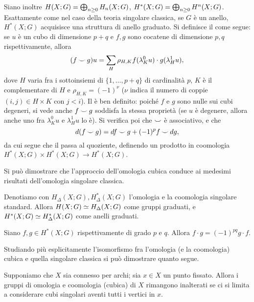 Siano inoltre $H(X;G)=\bigoplus_{n\ge 0}H_n(X;G)$, $H^*(X;G)=\bigoplus_{n\ge 0}H^n(X;G)$. Esattamente come nel caso della teoria singolare classica, se $G$ è un anello, $H^*(X;G)$ acquisisce una struttura di anello graduato. Si definisce il \cupproduct{} come segue: se $u$ è un cubo di dimensione $p+q$ e $f,g$ sono cocatene di dimensione $p,q$ rispettivamente, allora
$$
(f\mathbin{\smile} g)u=\sum_H\rho_{H,K}f(\lambda^0_Ku)\cdot g(\lambda^1_Hu),
$$
dove $H$ varia fra i sottoinsiemi di $\{1,\ldots,p+q\}$ di cardinalità $p$, $K$ è il complementare di $H$ e $\rho_{H,K}=(-1)^\nu$ ($\nu$ indica il numero di coppie $(i,j)\in H\times K$ con $j<i$). Il \cupproduct{} è ben definito: poiché $f$ e $g$ sono nulle sui cubi degeneri, si vede anche $f\mathbin{\smile} g$ soddisfa la stessa proprietà (se $u$ è degenere, allora anche uno fra $\lambda^0_Ku$ e $\lambda^1_Hu$ lo è). Si verifica poi che $\mathbin{\smile}$ è associativo, e che
$$
d(f\mathbin{\smile} g)=df\mathbin{\smile} g+(-1)^pf\mathbin{\smile} dg,
$$
da cui segue che il \cupproduct{} passa al quoziente, definendo un prodotto in coomologia $H^*(X;G)\times H^*(X;G)\to H^*(X;G)$.

Si può dimostrare che l'approccio dell'omologia cubica conduce ai medesimi risultati dell'omologia singolare classica.

\begin{proposition}
Denotiamo con $H_\Delta(X;G),H^*_\Delta(X;G)$ l'omologia e la coomologia singolare standard. Allora $H(X;G)\simeq H_\Delta(X;G)$ come gruppi graduati, e $H^*(X;G)\simeq H_\Delta^*(X;G)$ come anelli graduati.
\end{proposition}
\begin{corollary}
Siano $f,g\in H^*(X;G)$ rispettivamente di grado $p$ e $q$. Allora $f\cdot g=(-1)^{pq}g\cdot f$.
\end{corollary}
Studiando più esplicitamente l'isomorfismo fra l'omologia (e la coomologia) cubica e quella singolare classica si può dimostrare quanto segue.
\begin{proposition}
Supponiamo che $X$ sia connesso per archi; sia $x\in X$ un punto fissato. Allora i gruppi di omologia e coomologia (cubica)  di $X$ rimangono inalterati se ci si limita a considerare cubi singolari aventi tutti i vertici in $x$.
\end{proposition}

